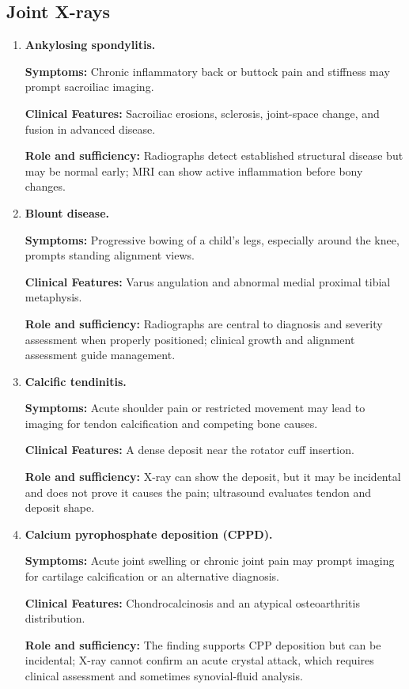 \subsection{Joint X-rays}
\begin{enumerate}[leftmargin=*,itemsep=0.45em,topsep=0.4em]
\item \textbf{Ankylosing spondylitis.}\par\noindent\textbf{Symptoms:} Chronic inflammatory back or buttock pain and stiffness may prompt sacroiliac imaging.\par\noindent\textbf{Clinical Features:} Sacroiliac erosions, sclerosis, joint-space change, and fusion in advanced disease.\par\noindent\textbf{Role and sufficiency:} Radiographs detect established structural disease but may be normal early; MRI can show active inflammation before bony changes.
\item \textbf{Blount disease.}\par\noindent\textbf{Symptoms:} Progressive bowing of a child's legs, especially around the knee, prompts standing alignment views.\par\noindent\textbf{Clinical Features:} Varus angulation and abnormal medial proximal tibial metaphysis.\par\noindent\textbf{Role and sufficiency:} Radiographs are central to diagnosis and severity assessment when properly positioned; clinical growth and alignment assessment guide management.
\item \textbf{Calcific tendinitis.}\par\noindent\textbf{Symptoms:} Acute shoulder pain or restricted movement may lead to imaging for tendon calcification and competing bone causes.\par\noindent\textbf{Clinical Features:} A dense deposit near the rotator cuff insertion.\par\noindent\textbf{Role and sufficiency:} X-ray can show the deposit, but it may be incidental and does not prove it causes the pain; ultrasound evaluates tendon and deposit shape.
\item \textbf{Calcium pyrophosphate deposition (CPPD).}\par\noindent\textbf{Symptoms:} Acute joint swelling or chronic joint pain may prompt imaging for cartilage calcification or an alternative diagnosis.\par\noindent\textbf{Clinical Features:} Chondrocalcinosis and an atypical osteoarthritis distribution.\par\noindent\textbf{Role and sufficiency:} The finding supports CPP deposition but can be incidental; X-ray cannot confirm an acute crystal attack, which requires clinical assessment and sometimes synovial-fluid analysis.

\end{enumerate}
